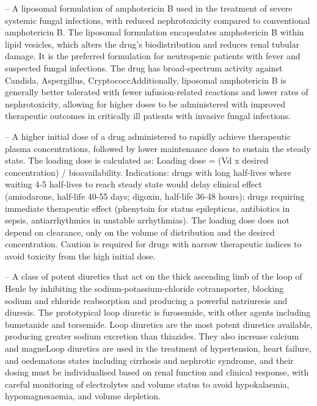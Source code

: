-- A liposomal formulation of amphotericin B used in the treatment of severe systemic fungal infections, with reduced nephrotoxicity compared to conventional amphotericin B. The liposomal formulation encapsulates amphotericin B within lipid vesicles, which alters the drug's biodistribution and reduces renal tubular damage. It is the preferred formulation for neutropenic patients with fever and suspected fungal infections. The drug has broad-spectrum activity against Candida, Aspergillus, CryptococcAdditionally, liposomal amphotericin B is generally better tolerated with fewer infusion-related reactions and lower rates of nephrotoxicity, allowing for higher doses to be administered with improved therapeutic outcomes in critically ill patients with invasive fungal infections.

-- A higher initial dose of a drug administered to rapidly achieve therapeutic plasma concentrations, followed by lower maintenance doses to sustain the steady state. The loading dose is calculated as: Loading dose = (Vd x desired concentration) / bioavailability. Indications: drugs with long half-lives where waiting 4-5 half-lives to reach steady state would delay clinical effect (amiodarone, half-life 40-55 days; digoxin, half-life 36-48 hours); drugs requiring immediate therapeutic effect (phenytoin for status epilepticus, antibiotics in sepsis, antiarrhythmics in unstable arrhythmias). The loading dose does not depend on clearance, only on the volume of distribution and the desired concentration. Caution is required for drugs with narrow therapeutic indices to avoid toxicity from the high initial dose.

-- A class of potent diuretics that act on the thick ascending limb of the loop of Henle by inhibiting the sodium-potassium-chloride cotransporter, blocking sodium and chloride reabsorption and producing a powerful natriuresis and diuresis. The prototypical loop diuretic is furosemide, with other agents including bumetanide and torsemide. Loop diuretics are the most potent diuretics available, producing greater sodium excretion than thiazides. They also increase calcium and magneLoop diuretics are used in the treatment of hypertension, heart failure, and oedematous states including cirrhosis and nephrotic syndrome, and their dosing must be individualised based on renal function and clinical response, with careful monitoring of electrolytes and volume status to avoid hypokalaemia, hypomagnesaemia, and volume depletion.

